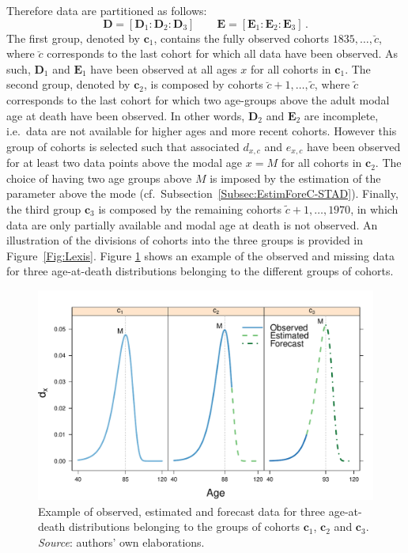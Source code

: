 \documentclass[11pt, a4paper]{article}
\begin{document}
Therefore data are partitioned as follows:
\begin{equation}\label{eq:DataDiv}
\bm{D} = \left[ \bm{D}_{1} : \bm{D}_{2} : \bm{D}_{3}\right] \qquad \bm{E} = \left[ \bm{E}_{1} : \bm{E}_{2} : \bm{E}_{3}\right] \, .
\end{equation}
The first group, denoted by $\bm{c}_1$, contains the fully observed cohorts $1835,\ldots,\breve{c}$, where $\breve{c}$ corresponds to the last cohort for which all data have been observed. As such, $\bm{D}_{1}$ and $\bm{E}_{1}$ have been observed at all ages $x$ for all cohorts in $\bm{c}_1$. The second group, denoted by $\bm{c}_2$, is composed by cohorts $\breve{c}+1, \ldots, \tilde{c}$, where $\tilde{c}$ corresponds to the last cohort for which two age-groups above the adult modal age at death have been observed. In other words, $\bm{D}_{2}$ and $\bm{E}_{2}$ are incomplete, i.e.~data are not available for higher ages and more recent cohorts. However this group of cohorts is selected such that associated $d_{x,c}$ and $e_{x,c}$ have been observed for at least two data points above the modal age $x=M$ for all cohorts in $\bm{c}_2$. The choice of having two age groups above $M$ is imposed by the estimation of the parameter above the mode (cf.~Subsection~\ref{Subsec:EstimForeC-STAD}). Finally, the third group $\bm{c}_3$ is composed by the remaining cohorts $\tilde{c}+1, \ldots, 1970$, in which data are only partially available and modal age at death is not observed. An illustration of the divisions of cohorts into the three groups is provided in Figure~\ref{Fig:Lexis}. Figure \ref{Fig:DxExample} shows an example of the observed and missing data for three age-at-death distributions belonging to the different groups of cohorts. 

\begin{figure}[t]
	\begin{center}
		\includegraphics[scale=0.7]{./Figures/F4.pdf} 
		\caption{Example of observed, estimated and forecast data for three age-at-death distributions belonging to the groups of cohorts $\bm{c}_1$, $\bm{c}_2$ and $\bm{c}_3$.\\
		\small \textit{Source}: authors' own elaborations.\label{Fig:DxExample} }    
	\end{center}
\end{figure}
\end{document}
